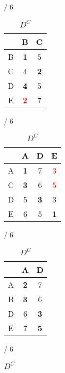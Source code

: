 \documentclass[a4paper, 11 pt, article, accentcolor=tud7b]{tudreport}
\begin{document}
	\begin{table}[h]
	  \begin{subtable}[b]{\textwidth / 6}
	    \begin{tabular}{| c | c | c |}
	      \hline
	        & B                   & C          \\ \hline
	      B & \textbf{1}          & 5          \\ \hline
	      C & 4                   & \textbf{2} \\ \hline
	      D & \textbf{4}          & 5          \\ \hline
	      E & \textbf{\textcolor{red}{2}} & 7  \\ \hline
	    \end{tabular}
	    \caption{$D^{A}$}
	  \end{subtable}
	  \hfill
	  \begin{subtable}[b]{\textwidth / 6}
	    \begin{tabular}{| c | c | c | c |}
	    \hline
	      & A                   & D          & E                  \\ \hline
	    A & \textbf{1}          & 7          & \textcolor{red}{3} \\ \hline
	    C & \textbf{3}          & 6          & \textcolor{red}{5} \\ \hline
	    D & 5                   & \textbf{3} & 3                  \\ \hline
	    E & 6                   & 5          & \textbf{1}         \\ \hline
	    \end{tabular}
	    \caption{$D^{B}$}
	  \end{subtable}
	  \hfill
	  \begin{subtable}[b]{\textwidth / 6}
	    \begin{tabular}{| c | c | c |}
	    \hline
	      & A                   & D          \\ \hline
	    A & \textbf{2}          & 7          \\ \hline
	    B & \textbf{3}          & 6          \\ \hline
	    D & 6                   & \textbf{3} \\ \hline
	    E & 7                   & \textbf{5} \\ \hline
	    \end{tabular}
	    \caption{$D^{C}$}
	  \end{subtable}
    \hfill
	  \begin{subtable}[b]{\textwidth / 6}
	    \begin{tabular}{| c | c | c | c |}

\end{tabular}
\end{subtable}
\end{table}
\end{document}
